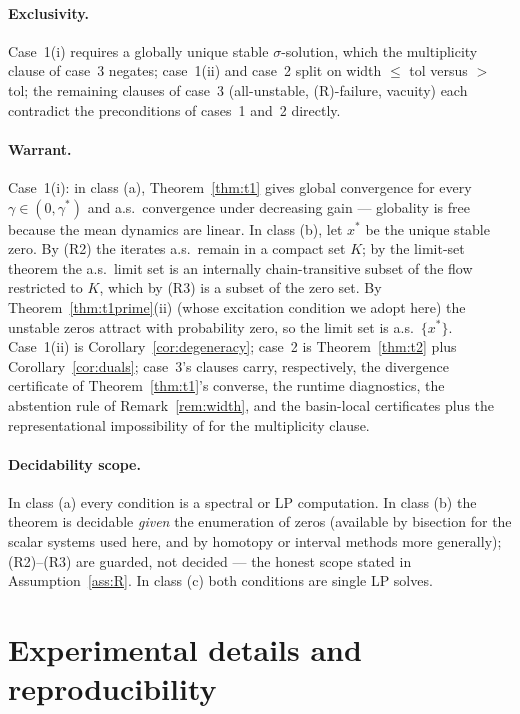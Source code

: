 \documentclass[pmlr]{jmlr}
\newcommand{\gstar}{\gamma^{*}}
\begin{document}
\paragraph{Exclusivity.} Case~1(i) requires a globally unique stable $\sigma$-solution, which
the multiplicity clause of case~3 negates; case~1(ii) and case~2 split on width $\leq$ tol
versus $>$ tol; the remaining clauses of case~3 (all-unstable, (R)-failure, vacuity) each
contradict the preconditions of cases~1 and~2 directly.

\paragraph{Warrant.} Case~1(i): in class (a), Theorem~\ref{thm:t1} gives global convergence for
every $\gamma \in (0,\gstar)$ and a.s.\ convergence under decreasing gain --- globality is free
because the mean dynamics are linear. In class (b), let $x^*$ be the unique stable zero. By
(R2) the iterates a.s.\ remain in a compact set $K$; by the limit-set theorem the a.s.\ limit
set is an internally chain-transitive subset of the flow restricted to $K$, which by (R3) is a
subset of the zero set. By Theorem~\ref{thm:t1prime}(ii) (whose excitation condition we adopt
here) the unstable zeros attract with probability zero, so the limit set is a.s.\ $\{x^*\}$.
Case~1(ii) is Corollary~\ref{cor:degeneracy}; case~2 is Theorem~\ref{thm:t2} plus
Corollary~\ref{cor:duals}; case~3's clauses carry, respectively, the divergence certificate of
Theorem~\ref{thm:t1}'s converse, the runtime diagnostics, the abstention rule of
Remark~\ref{rem:width}, and the basin-local certificates plus the representational
impossibility of \citet{blom2019beyond} for the multiplicity clause.

\paragraph{Decidability scope.} In class (a) every condition is a spectral or LP computation.
In class (b) the theorem is decidable \emph{given} the enumeration of zeros (available by
bisection for the scalar systems used here, and by homotopy or interval methods more
generally); (R2)--(R3) are guarded, not decided --- the honest scope stated in
Assumption~\ref{ass:R}. In class (c) both conditions are single LP solves. \hfill\BlackBox

\section{Experimental details and reproducibility}\label{app:exp}
\end{document}
